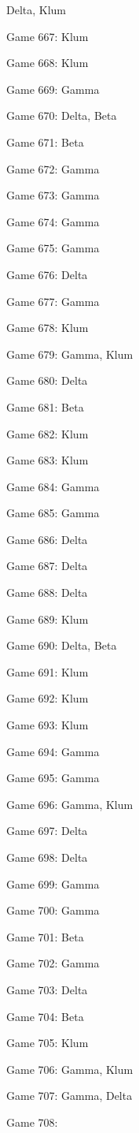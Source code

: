 \documentclass{article}
\begin{document}
\begin{multicols}{3}
\begin{compactitem}
Delta, Klum
\item Game 667:
Klum
\item Game 668:
Klum
\item Game 669:
Gamma
\item Game 670:
Delta, Beta
\item Game 671:
Beta
\item Game 672:
Gamma
\item Game 673:
Gamma
\item Game 674:
Gamma
\item Game 675:
Gamma
\item Game 676:
Delta
\item Game 677:
Gamma
\item Game 678:
Klum
\item Game 679:
Gamma, Klum
\item Game 680:
Delta
\item Game 681:
Beta
\item Game 682:
Klum
\item Game 683:
Klum
\item Game 684:
Gamma
\item Game 685:
Gamma
\item Game 686:
Delta
\item Game 687:
Delta
\item Game 688:
Delta
\item Game 689:
Klum
\item Game 690:
Delta, Beta
\item Game 691:
Klum
\item Game 692:
Klum
\item Game 693:
Klum
\item Game 694:
Gamma
\item Game 695:
Gamma
\item Game 696:
Gamma, Klum
\item Game 697:
Delta
\item Game 698:
Delta
\item Game 699:
Gamma
\item Game 700:
Gamma
\item Game 701:
Beta
\item Game 702:
Gamma
\item Game 703:
Delta
\item Game 704:
Beta
\item Game 705:
Klum
\item Game 706:
Gamma, Klum
\item Game 707:
Gamma, Delta
\item Game 708:

\end{compactitem}
\end{multicols}
\end{document}
